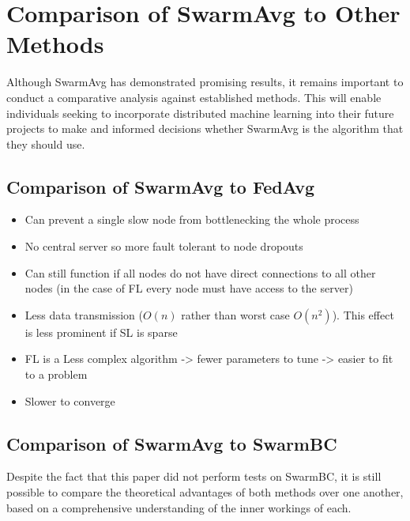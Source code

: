 \section{Comparison of SwarmAvg to Other Methods}
Although SwarmAvg has demonstrated promising results, it remains important to conduct a comparative analysis against established methods. This will enable individuals seeking to incorporate distributed machine learning into their future projects to make and informed decisions whether SwarmAvg is the algorithm that they should use.

\subsection{Comparison of SwarmAvg to FedAvg}

\begin{itemize}
	\item Can prevent a single slow node from bottlenecking the whole process
	\item No central server so more fault tolerant to node dropouts
	\item Can still function if all nodes do not have direct connections to all other nodes (in the case of FL every node must have access to the server)
\end{itemize}


\begin{itemize}
	\item Less data transmission ($O(n)$ rather than worst case $O(n^2)$). This effect is less prominent if SL is sparse
	\item FL is a Less complex algorithm -> fewer parameters to tune -> easier to fit to a problem
	\item Slower to converge
\end{itemize}

\subsection{Comparison of SwarmAvg to SwarmBC}
Despite the fact that this paper did not perform tests on SwarmBC, it is still possible to compare the theoretical advantages of both methods over one another, based on a comprehensive understanding of the inner workings of each.

